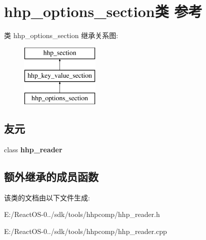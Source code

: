 \hypertarget{classhhp__options__section}{}\section{hhp\+\_\+options\+\_\+section类 参考}
\label{classhhp__options__section}
类 hhp\+\_\+options\+\_\+section 继承关系图\+:\begin{figure}[H]
\begin{center}
\leavevmode
\includegraphics[height=3.000000cm]{classhhp__options__section}
\end{center}
\end{figure}
\subsection*{友元}
\begin{DoxyCompactItemize}
\item 
\mbox{\label{classhhp__options__section_aa7b5f80bf368d4c70c7b78a5e7f61945}} 
class {\bfseries hhp\+\_\+reader}
\end{DoxyCompactItemize}
\subsection*{额外继承的成员函数}


该类的文档由以下文件生成\+:\begin{DoxyCompactItemize}
\item 
E\+:/\+React\+O\+S-\/0../sdk/tools/hhpcomp/hhp\+\_\+reader.\+h\item 
E\+:/\+React\+O\+S-\/0../sdk/tools/hhpcomp/hhp\+\_\+reader.\+cpp\end{DoxyCompactItemize}
